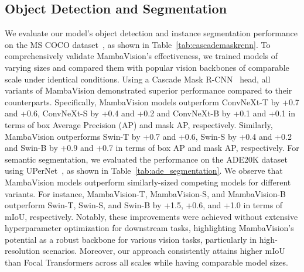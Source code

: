 \documentclass[10pt,twocolumn,letterpaper]{article}
\begin{document}
\subsection{Object Detection and Segmentation}
We evaluate our model's object detection and instance segmentation performance on the MS COCO dataset~\cite{lin2014microsoft}, as shown in Table~\ref{tab:cascademaskrcnn}. To comprehensively validate MambaVision's effectiveness, we trained models of varying sizes and compared them with popular vision backbones of comparable scale under identical conditions. Using a Cascade Mask R-CNN~\cite{he2017mask} head, all variants of MambaVision demonstrated superior performance compared to their counterparts. Specifically, MambaVision models outperform ConvNeXt-T by +0.7 and +0.6, ConvNeXt-S by +0.4 and +0.2 and ConvNeXt-B by +0.1 and +0.1 in terms of box Average Precision (AP) and mask AP, respectively. Similarly, MambaVision outperforms Swin-T by +0.7 and +0.6, Swin-S by +0.4 and +0.2 and Swin-B by +0.9 and +0.7 in terms of box AP and mask AP, respectively. For semantic segmentation, we evaluated the performance on the ADE20K dataset~\cite{zhou2017scene} using UPerNet~\cite{xiao2018unified}, as shown in Table~\ref{tab:ade_segmentation}. We observe that MambaVision models outperform similarly-sized competing models for different variants. For instance, MambaVision-T, MambaVision-S, and MambaVision-B outperform Swin-T, Swin-S, and Swin-B by +1.5, +0.6, and +1.0 in terms of mIoU, respectively. Notably, these improvements were achieved without extensive hyperparameter optimization for downstream tasks, highlighting MambaVision's potential as a robust backbone for various vision tasks, particularly in high-resolution scenarios. Moreover, our approach consistently attains higher mIoU than Focal Transformers across all scales while having comparable model sizes. 
\end{document}
